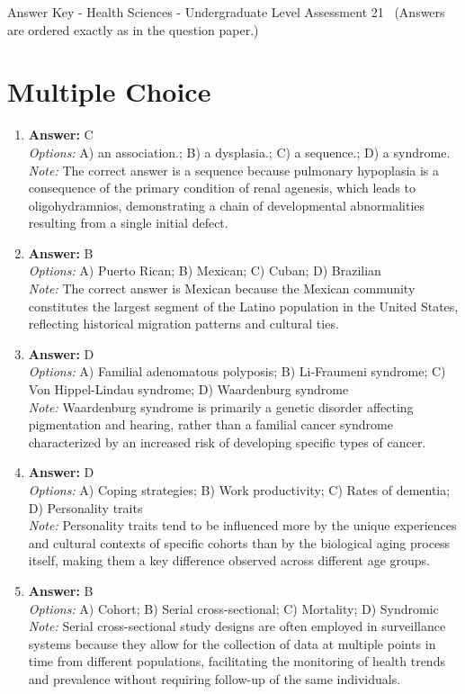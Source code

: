 \documentclass[12pt]{article}
\begin{document}
\begin{center}
Answer Key - Health Sciences - Undergraduate Level Assessment 21 \
\small (Answers are ordered exactly as in the question paper.)
\end{center}

\section*{Multiple Choice}
\begin{enumerate}[label=\arabic*.]
\item \textbf{Answer:} C
\\ \textit{Options:} A) an association.; B) a dysplasia.; C) a sequence.; D) a syndrome.
\\ \textit{Note:} The correct answer is a sequence because pulmonary hypoplasia is a consequence of the primary condition of renal agenesis, which leads to oligohydramnios, demonstrating a chain of developmental abnormalities resulting from a single initial defect.
\item \textbf{Answer:} B
\\ \textit{Options:} A) Puerto Rican; B) Mexican; C) Cuban; D) Brazilian
\\ \textit{Note:} The correct answer is Mexican because the Mexican community constitutes the largest segment of the Latino population in the United States, reflecting historical migration patterns and cultural ties.
\item \textbf{Answer:} D
\\ \textit{Options:} A) Familial adenomatous polyposis; B) Li-Fraumeni syndrome; C) Von Hippel-Lindau syndrome; D) Waardenburg syndrome
\\ \textit{Note:} Waardenburg syndrome is primarily a genetic disorder affecting pigmentation and hearing, rather than a familial cancer syndrome characterized by an increased risk of developing specific types of cancer.
\item \textbf{Answer:} D
\\ \textit{Options:} A) Coping strategies; B) Work productivity; C) Rates of dementia; D) Personality traits
\\ \textit{Note:} Personality traits tend to be influenced more by the unique experiences and cultural contexts of specific cohorts than by the biological aging process itself, making them a key difference observed across different age groups.
\item \textbf{Answer:} B
\\ \textit{Options:} A) Cohort; B) Serial cross-sectional; C) Mortality; D) Syndromic
\\ \textit{Note:} Serial cross-sectional study designs are often employed in surveillance systems because they allow for the collection of data at multiple points in time from different populations, facilitating the monitoring of health trends and prevalence without requiring follow-up of the same individuals.
\end{enumerate}
\end{document}
